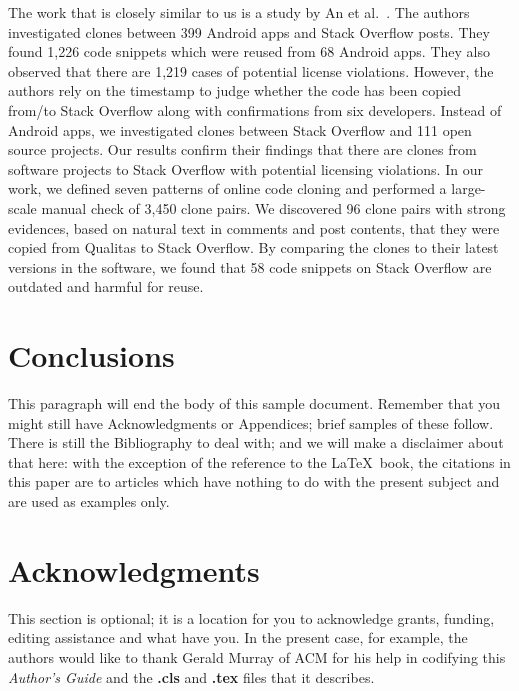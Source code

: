 \documentclass[sigconf,review, anonymous]{acmart}
\begin{document}
The work that is closely similar to us is a study by An et al.~\cite{An2017}. The authors investigated clones between 399 Android apps and Stack Overflow posts. They found 1,226 code snippets which were reused from 68 Android apps. They also observed that there are 1,219 cases of potential license violations. However, the authors rely on the timestamp to judge whether the code has been copied from/to Stack Overflow along with confirmations from six developers. Instead of Android apps, we investigated clones between Stack Overflow and 111 open source projects. Our results confirm their findings that there are clones from software projects to Stack Overflow with potential licensing violations. In our work, we defined seven patterns of online code cloning and performed a large-scale manual check of 3,450 clone pairs. We discovered 96 clone pairs with strong evidences, based on natural text in comments and post contents, that they were copied from Qualitas to Stack Overflow. By comparing the clones to their latest versions in the software, we found that 58 code snippets on Stack Overflow are outdated and harmful for reuse.

\section{Conclusions}
This paragraph will end the body of this sample document.
Remember that you might still have Acknowledgments or
Appendices; brief samples of these
follow.  There is still the Bibliography to deal with; and
we will make a disclaimer about that here: with the exception
of the reference to the \LaTeX\ book, the citations in
this paper are to articles which have nothing to
do with the present subject and are used as
examples only.

\section{Acknowledgments}
This section is optional; it is a location for you
to acknowledge grants, funding, editing assistance and
what have you.  In the present case, for example, the
authors would like to thank Gerald Murray of ACM for
his help in codifying this \textit{Author's Guide}
and the \textbf{.cls} and \textbf{.tex} files that it describes.
\end{document}
